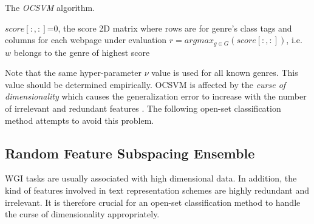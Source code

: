 \begin{algorithm}[t]
\caption{The \textit{OCSVM} algorithm.}\label{chap:openset:sec:alg:OCSVM_Ensemble}
$score[:, :]$=0, the score 2D matrix where rows are for genre's class tags and columns for each webpage under evaluation
{
        $r = argmax_{g \in G}(score[:, :])$, i.e. $w$ belongs to the genre of highest score\;
    }
\end{algorithm}

\hfill

Note that the same hyper-parameter $\nu$ value is used for all known genres. This value should be determined empirically. OCSVM is affected by the \textit{curse of dimensionality} which causes the generalization error to increase with the number of irrelevant and redundant features \parencite{Erfani:2016}. The following open-set classification method attempts to avoid this problem.


\subsection{Random Feature Subspacing Ensemble}\label{chap:openset:sec:RFSE_Description}

WGI tasks are usually associated with high dimensional data. In addition, the kind of features involved in text representation schemes are highly redundant and irrelevant. It is therefore crucial for an open-set classification method to handle the curse of dimensionality appropriately.


